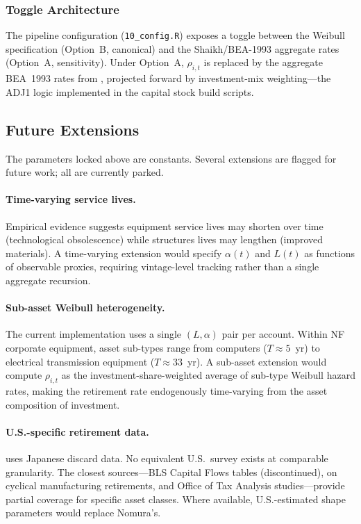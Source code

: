 \subsubsection{Toggle Architecture}
\label{app:ret:toggle}

The pipeline configuration (\texttt{10\_config.R}) exposes a toggle between the
Weibull specification (Option~B, canonical) and the Shaikh/BEA-1993 aggregate
rates (Option~A, sensitivity). Under Option~A, $\rho_{i,t}$ is replaced by the
aggregate BEA~1993 rates from \citet[Appendix~6.8.II.3]{Shaikh2016}, projected
forward by investment-mix weighting---the ADJ1 logic implemented in the
capital stock build scripts.


\subsection{Future Extensions}
\label{app:ret:extensions}

The parameters locked above are constants. Several extensions are flagged for
future work; all are currently parked.

\paragraph{Time-varying service lives.}
Empirical evidence suggests equipment service lives may shorten over time
(technological obsolescence) while structures lives may lengthen (improved
materials). A time-varying extension would specify $\alpha(t)$ and $L(t)$ as
functions of observable proxies, requiring vintage-level tracking rather than a
single aggregate recursion.

\paragraph{Sub-asset Weibull heterogeneity.}
The current implementation uses a single $(L, \alpha)$ pair per account. Within
NF corporate equipment, asset sub-types range from computers ($T \approx 5$~yr)
to electrical transmission equipment ($T \approx 33$~yr). A sub-asset extension
would compute $\rho_{i,t}$ as the investment-share-weighted average of sub-type
Weibull hazard rates, making the retirement rate endogenously time-varying from
the asset composition of investment.

\paragraph{U.S.-specific retirement data.}
\citet{Nomura2005} uses Japanese discard data. No equivalent U.S.\ survey exists
at comparable granularity. The closest sources---BLS Capital Flows tables
(discontinued), \citet{Powers1988} on cyclical manufacturing retirements, and
Office of Tax Analysis studies---provide partial coverage for specific asset
classes. Where available, U.S.-estimated shape parameters would replace Nomura's.

